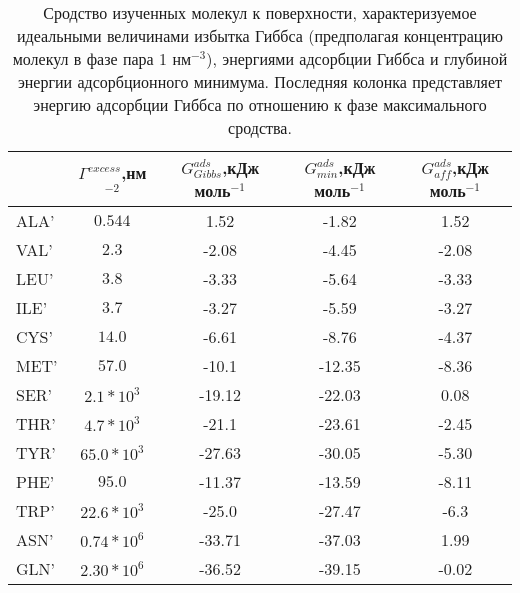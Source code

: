 \begin{table}[p]
\caption{Сродство изученных молекул к поверхности, характеризуемое идеальными величинами избытка Гиббса (предполагая концентрацию молекул в фазе пара 1 нм$^{-3}$), энергиями адсорбции Гиббса и глубиной энергии адсорбционного минимума. Последняя колонка представляет энергию адсорбции Гиббса по отношению к фазе максимального сродства.}
	\label{ads_fe}	
	\begin{tabular}{lcccc}
	 & $\Gamma^{excess}$,нм$^{-2}$& $G^{ads}_{Gibbs}$,кДж моль$^{-1}$& $G^{ads}_{min}$,кДж моль$^{-1}$&$G^{ads}_{aff}$,кДж моль$^{-1}$\\
	\hline

ALA'  &$  0.544       $&   1.52 &  -1.82 &  1.52\\
VAL'  &$  2.3         $&  -2.08 &  -4.45 & -2.08\\
LEU'  &$  3.8         $&  -3.33 &  -5.64 & -3.33\\
ILE'  &$  3.7         $&  -3.27 &  -5.59 & -3.27\\
CYS'  &$ 14.0         $&  -6.61 &  -8.76 & -4.37\\
MET'  &$ 57.0         $& -10.1  & -12.35 & -8.36\\
SER'  &$ 2.1*10^3     $& -19.12 & -22.03 &  0.08\\
THR'  &$ 4.7*10^3     $& -21.1  & -23.61 & -2.45\\
TYR'  &$ 65.0*10^3    $& -27.63 & -30.05 & -5.30\\
PHE'  &$ 95.0         $& -11.37 & -13.59 & -8.11\\
TRP'  &$ 22.6*10^3    $& -25.0  & -27.47 & -6.3\\
ASN'  &$0.74*10^6     $& -33.71 & -37.03 &  1.99\\
GLN'  &$2.30*10^6     $& -36.52 & -39.15 & -0.02\\
\end{tabular}
	
	
	\vspace{3 in}
\end{table}
